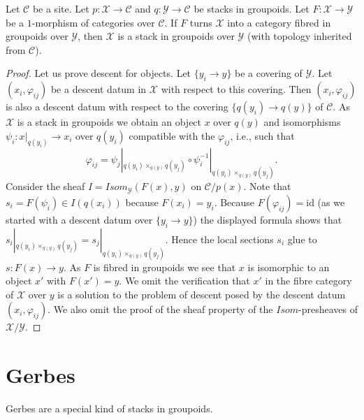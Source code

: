 \begin{lemma}
\label{lemma-stack-in-groupoids-over-stack-in-groupoids}
Let $\mathcal{C}$ be a site. Let $p : \mathcal{X} \to \mathcal{C}$
and $q : \mathcal{Y} \to \mathcal{C}$
be stacks in groupoids. Let $F : \mathcal{X} \to \mathcal{Y}$
be a $1$-morphism of categories over $\mathcal{C}$. If $F$ turns
$\mathcal{X}$ into a category fibred in groupoids over $\mathcal{Y}$,
then $\mathcal{X}$ is a stack in groupoids over $\mathcal{Y}$ (with
topology inherited from $\mathcal{C}$).
\end{lemma}

\begin{proof}
Let us prove descent for objects. Let $\{y_i \to y\}$ be a covering
of $\mathcal{Y}$. Let $(x_i, \varphi_{ij})$ be a descent datum in $\mathcal{X}$
with respect to this covering. Then $(x_i, \varphi_{ij})$ is also a descent
datum with respect to the covering $\{q(y_i) \to q(y)\}$ of
$\mathcal{C}$. As $\mathcal{X}$ is a stack in groupoids we obtain an
object $x$ over $q(y)$ and isomorphisms $\psi_i : x|_{q(y_i)} \to x_i$
over $q(y_i)$ compatible with the $\varphi_{ij}$, i.e., such that
$$
\varphi_{ij} = \psi_j|_{q(y_i) \times_{q(y)} q(y_j)}
\circ \psi_i^{-1}|_{q(y_i) \times_{q(y)} q(y_j)}.
$$
Consider the sheaf $\mathit{I} = \mathit{Isom}_\mathcal{Y}(F(x), y)$
on $\mathcal{C}/p(x)$. Note that $s_i = F(\psi_i) \in \mathit{I}(q(x_i))$
because $F(x_i) = y_i$. Because $F(\varphi_{ij}) = \text{id}$ (as we started
with a descent datum over $\{y_i \to y\}$) the displayed formula shows
that $s_i|_{q(y_i) \times_{q(y)} q(y_j)} = s_j|_{q(y_i) \times_{q(y)} q(y_j)}$.
Hence the local sections $s_i$ glue to $s : F(x) \to y$. As $F$ is fibred in
groupoids we see that $x$ is isomorphic to an object $x'$ with $F(x') = y$.
We omit the verification that $x'$ in the fibre category of $\mathcal{X}$
over $y$ is a solution to the problem of descent posed by the descent datum
$(x_i, \varphi_{ij})$. We also omit the proof of the sheaf property
of the $\mathit{Isom}$-presheaves of $\mathcal{X}/\mathcal{Y}$.
\end{proof}





\section{Gerbes}
\label{section-gerbes}

\noindent
Gerbes are a special kind of stacks in groupoids.

